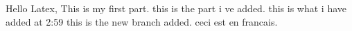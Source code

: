 \documentclass[a4paper]{article}
\begin{document}
Hello Latex, This is my first part.\newline
this is the part i ve added.\newline
this is what i have added at 2:59\newline
this is the new branch added.
ceci est en francais.

\end{document}
